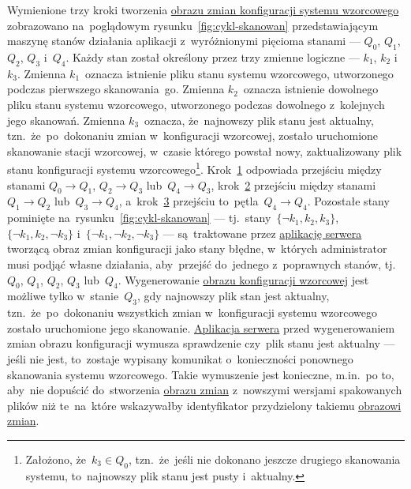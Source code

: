 \documentclass[thesis]{subfiles}
\begin{document}
Wymienione trzy kroki tworzenia \hyperref[sec:obraz-zmian-konfiguracji]{obrazu zmian konfiguracji systemu wzorcowego} zobrazowano na~poglądowym rysunku~\ref{fig:cykl-skanowan} przedstawiającym maszynę stanów działania aplikacji z~wyróżnionymi pięcioma stanami --- $Q_0$, $Q_1$, $Q_2$, $Q_3$ i~$Q_4$. Każdy stan został określony przez trzy zmienne logiczne --- $k_1$, $k_2$ i~$k_3$. Zmienna $k_1$~oznacza istnienie pliku stanu systemu wzorcowego, utworzonego podczas pierwszego skanowania~go. Zmienna $k_2$~oznacza istnienie dowolnego pliku stanu systemu wzorcowego, utworzonego podczas dowolnego z~kolejnych jego skanowań. Zmienna $k_3$~oznacza, że~najnowszy plik stanu jest aktualny, tzn.~że~po~dokonaniu zmian w~konfiguracji wzorcowej, zostało uruchomione skanowanie stacji wzorcowej, w~czasie którego powstał nowy, zaktualizowany plik stanu konfiguracji systemu wzorcowego\footnote{Założono, że~$k_3\in Q_0$, tzn.~że~jeśli nie dokonano jeszcze drugiego skanowania systemu, to~najnowszy plik stanu jest pusty i~aktualny.}. Krok~\hyperlink{itm:pierwsze-skanowanie}{1} odpowiada przejściu między stanami $Q_0\rightarrow Q_1$, $Q_2\rightarrow Q_3$ lub~$Q_4\rightarrow Q_3$, krok~\hyperlink{itm:dokonanie-zmian}{2} przejściu między stanami $Q_1\rightarrow Q_2$ lub~$Q_3\rightarrow Q_4$, a~krok~\hyperlink{itm:dokonanie-zmian}{3} przejściu to~pętla~$Q_4\rightarrow Q_4$. Pozostałe stany pominięte na~rysunku~\ref{fig:cykl-skanowan} --- tj.~stany~$\{\neg k_1,k_2,k_3\}$, $\{\neg k_1,k_2,\neg k_3\}$ i~$\{\neg k_1,\neg k_2,\neg k_3\}$ --- są~traktowane przez \hyperref[sec:srv-app]{aplikację serwera} tworzącą obraz zmian konfiguracji jako stany błędne, w~których administrator musi podjąć własne działania, aby~przejść do~jednego z~poprawnych stanów, tj.~$Q_0$, $Q_1$, $Q_2$, $Q_3$ lub~$Q_4$. Wygenerowanie \hyperref[sec:obraz-zmian-konfiguracji]{obrazu konfiguracji wzorcowej} jest możliwe tylko w~stanie~$Q_3$, gdy najnowszy plik stan jest aktualny, tzn.~że~po~dokonaniu wszystkich zmian w~konfiguracji systemu wzorcowego zostało uruchomione jego skanowanie. \hyperref[sec:srv-app]{Aplikacja serwera} przed wygenerowaniem zmian obrazu konfiguracji wymusza sprawdzenie czy~plik stanu jest aktualny --- jeśli nie jest, to~zostaje wypisany komunikat o~konieczności ponownego skanowania systemu wzorcowego. Takie wymuszenie jest konieczne, m.in.~po to, aby~nie dopuścić do~stworzenia \hyperref[sec:obraz-zmian-konfiguracji]{obrazu zmian} z~nowszymi wersjami spakowanych plików niż te~na~które wskazywałby identyfikator przydzielony takiemu \hyperref[sec:obraz-zmian-konfiguracji]{obrazowi zmian}.
\end{document}
